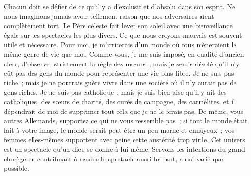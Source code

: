 \documentclass[french,twoside]{book} %
\begin{document}
Chacun doit se défier de ce qu’il y a d’exclusif et d’absolu dans son esprit. Ne nous imaginons jamais avoir tellement raison que nos adversaires aient complètement tort. Le Père céleste fait lever son soleil avec une bienveillance égale sur les spectacles les plus divers. Ce que nous croyons mauvais est souvent utile et nécessaire. Pour moi, je m’irriterais d’un monde où tous mèneraient le même genre de vie que moi. Comme vous, je me suis imposé, en qualité d’ancien clerc, d’observer strictement la règle des mœurs ; mais je serais désolé qu’il n’y eût pas des gens du monde pour représenter une vie plus libre. Je ne suis pas riche ; mais je ne pourrais guère vivre dans une société où il n’y aurait pas de gens riches. Je ne suis pas catholique ; mais je suis bien aise qu’il y ait des catholiques, des sœurs de charité, des curés de campagne, des carmélites, et il dépendrait de moi de supprimer tout cela que je ne le ferais pas. De même, vous autres Allemands, supportez ce qui ne vous ressemble pas ; si tout le monde était fait à votre image, le monde serait peut-être un peu morne et ennuyeux ; vos femmes elles-mêmes supportent avec peine cette austérité trop virile. Cet univers est un spectacle qu’un dieu se donne à lui-même. Servons les intentions du grand chorège en contribuant à rendre le spectacle aussi brillant, aussi varié que possible.\par
\end{document}
